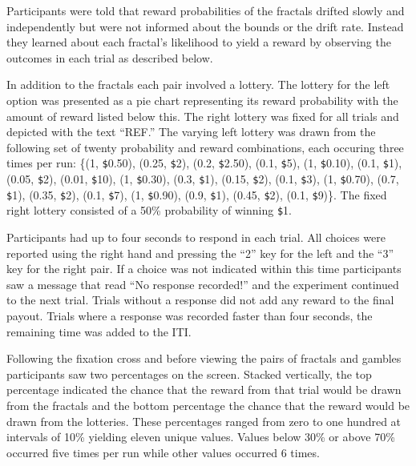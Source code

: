 \documentclass[
  english,
  man]{apa6}
\begin{document}
Participants were told that reward probabilities of the fractals drifted slowly and independently but were not informed about the bounds or the drift rate. Instead they learned about each fractal's likelihood to yield a reward by observing the outcomes in each trial as described below.

In addition to the fractals each pair involved a lottery. The lottery for the left option was presented as a pie chart representing its reward probability with the amount of reward listed below this. The right lottery was fixed for all trials and depicted with the text ``REF.'' The varying left lottery was drawn from the following set of twenty probability and reward combinations, each occuring three times per run: \{(1, \texttt{\$}0.50), (0.25, \texttt{\$}2), (0.2, \texttt{\$}2.50), (0.1, \texttt{\$}5), (1, \texttt{\$}0.10), (0.1, \texttt{\$}1), (0.05, \texttt{\$}2), (0.01, \texttt{\$}10), (1, \texttt{\$}0.30), (0.3, \texttt{\$}1), (0.15, \texttt{\$}2), (0.1, \texttt{\$}3), (1, \texttt{\$}0.70), (0.7, \texttt{\$}1), (0.35, \texttt{\$}2), (0.1, \texttt{\$}7), (1, \texttt{\$}0.90), (0.9, \texttt{\$}1), (0.45, \texttt{\$}2), (0.1, \texttt{\$}9)\}. The fixed right lottery consisted of a 50\% probability of winning \texttt{\$}1.

Participants had up to four seconds to respond in each trial. All choices were reported using the right hand and pressing the ``2'' key for the left and the ``3'' key for the right pair. If a choice was not indicated within this time participants saw a message that read ``No response recorded!'' and the experiment continued to the next trial. Trials without a response did not add any reward to the final payout. Trials where a response was recorded faster than four seconds, the remaining time was added to the ITI.

Following the fixation cross and before viewing the pairs of fractals and gambles participants saw two percentages on the screen. Stacked vertically, the top percentage indicated the chance that the reward from that trial would be drawn from the fractals and the bottom percentage the chance that the reward would be drawn from the lotteries. These percentages ranged from zero to one hundred at intervals of 10\% yielding eleven unique values. Values below 30\% or above 70\% occurred five times per run while other values occurred 6 times.
\end{document}
